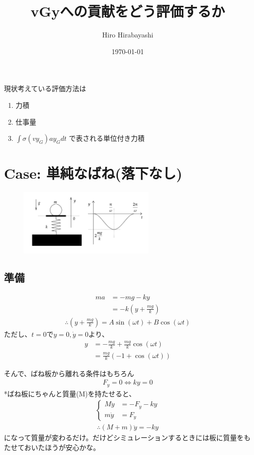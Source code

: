 \documentclass[a4paper,11pt]{jsarticle}
\begin{document}
\title{vGyへの貢献をどう評価するか}
\author{Hiro Hirabayashi}
\date{\today}
\maketitle

現状考えている評価方法は
\begin{enumerate}
  \item 力積
  \item 仕事量
  \item $\int\sigma (vy_G)ay_G dt$ で表される単位付き力積
\end{enumerate}

\section{Case: 単純なばね(落下なし)}

\begin{figure}[h]
  \centering
  \includegraphics[width = 0.6\textwidth]{simple_string.png}
  \caption{}
  \label{simple_string.png}
\end{figure}

\subsection{準備}
\begin{align}
  ma & = -mg - ky
  \\ &= -k\left(y + \frac{mg}{k}\right)
\end{align}
\begin{align}
  \therefore
  \left(y+\frac{mg}{k}\right) = A\sin(\omega t) + B\cos(\omega t)
\end{align}
ただし、$t=0$で$y=0,\dot{y}=0$より、
\begin{align}
  y & = -\frac{mg}{k} + \frac{mg}{k}\cos(\omega t)
  \\ &= \frac{mg}{k}\left(-1+\cos(\omega t)\right)
\end{align}

そんで、ばね板から離れる条件はもちろん
\begin{align}
  F_y = 0 \Leftrightarrow ky = 0
\end{align}
*ばね板にちゃんと質量(M)を持たせると、
\begin{align}
  \begin{cases}
    M\ddot{y} & = -F_y - ky
    \\ m\ddot{y} &= F_y
  \end{cases}
\end{align}
\begin{align}
  \therefore (M + m)\ddot{y} = - ky
\end{align}
になって質量が変わるだけ。だけどシミュレーションするときには板に質量をもたせておいたほうが安心かな。
\end{document}

